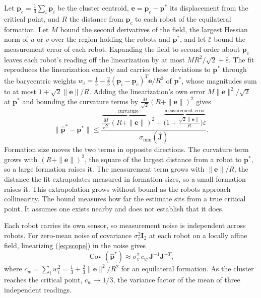 \documentclass[lettersize,journal]{IEEEtran}
\begin{document}
Let $\mathbf{p}_c = \frac{1}{3}\sum_i\mathbf{p}_i$ be the cluster centroid, $\mathbf{e} = \mathbf{p}_c - \mathbf{p}^*$ its displacement from the critical point, and $R$ the distance from $\mathbf{p}_c$ to each robot of the equilateral formation. Let $M$ bound the second derivatives of the field, the largest Hessian norm of $u$ or $v$ over the region holding the robots and $\mathbf{p}^*$, and let $\bar{\varepsilon}$ bound the measurement error of each robot. Expanding the field to second order about $\mathbf{p}_c$ leaves each robot's reading off the linearization by at most $MR^2/\sqrt{2} + \bar{\varepsilon}$. The fit reproduces the linearization exactly and carries these deviations to $\mathbf{p}^*$ through the barycentric weights $w_i = \frac{1}{3} - \frac{2}{3}(\mathbf{p}_i - \mathbf{p}_c)^T\mathbf{e}/R^2$ of $\mathbf{p}^*$, whose magnitudes sum to at most $1 + \sqrt{2}\|\mathbf{e}\|/R$. Adding the linearization's own error $M\|\mathbf{e}\|^2/\sqrt{2}$ at $\mathbf{p}^*$ and bounding the curvature terms by $\tfrac{M}{\sqrt{2}}(R + \|\mathbf{e}\|)^2$ gives
\begin{equation}\label{eq:bound}
\|\hat{\mathbf{p}}^* - \mathbf{p}^*\| \le \frac{\overbrace{\tfrac{M}{\sqrt{2}}(R + \|\mathbf{e}\|)^2}^{\text{curvature}} + \overbrace{\bigl(1 + \tfrac{\sqrt{2}\|\mathbf{e}\|}{R}\bigr)\bar{\varepsilon}}^{\text{measurement error}}}{\sigma_{\min}(\hat{\mathbf{J}})}.
\end{equation}
Formation size moves the two terms in opposite directions. The curvature term grows with $(R + \|\mathbf{e}\|)^2$, the square of the largest distance from a robot to $\mathbf{p}^*$, so a large formation raises it. The measurement term grows with $\|\mathbf{e}\|/R$, the distance the fit extrapolates measured in formation sizes, so a small formation raises it. This extrapolation grows without bound as the robots approach collinearity. The bound measures how far the estimate sits from a true critical point. It assumes one exists nearby and does not establish that it does.

Each robot carries its own sensor, so measurement noise is independent across robots. For zero-mean noise of covariance $\sigma_v^2\mathbf{I}_2$ at each robot on a locally affine field, linearizing (\ref{eq:scope}) in the noise gives
\begin{equation}\label{eq:cov}
\operatorname{Cov}(\hat{\mathbf{p}}^*) \approx \sigma_v^2\, c_w\, \mathbf{J}^{-1}\mathbf{J}^{-T},
\end{equation}
where $c_w = \sum_i w_i^2 = \frac{1}{3} + \frac{2}{3}\|\mathbf{e}\|^2/R^2$ for an equilateral formation. As the cluster reaches the critical point, $c_w \to 1/3$, the variance factor of the mean of three independent readings.
\end{document}
